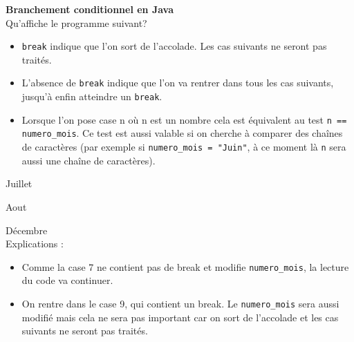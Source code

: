  \begin{Exercice}[10 minutes] \textbf{Branchement conditionnel en Java}\\
   Qu'affiche le programme suivant? 
   
   
    
     \begin{conseil}
          \begin{itemize}
             \item \lstinline{break} indique que l'on sort de l'accolade. Les cas suivants ne seront pas traités.
             \item L'absence de \lstinline{break} indique que l'on va rentrer dans tous les cas suivants, jusqu'à enfin atteindre un \lstinline{break}.
             \item Lorsque l'on pose case n où n est un nombre cela est équivalent au test \lstinline{n == numero_mois}. Ce test est aussi valable si on cherche à comparer des chaînes de caractères (par exemple si \lstinline{numero_mois = "Juin"}, à ce moment là \lstinline{n} sera aussi une chaîne de caractères).
          \end{itemize}
         
     \end{conseil}
     \begin{solution}
     
     Juillet
     
    Aout
    
    Décembre \\
    
    Explications : \\
    
    \begin{itemize}
             \item Comme la case 7 ne contient pas de break et modifie \lstinline{numero_mois}, la lecture du code va continuer.
             \item On rentre dans le case 9, qui contient un break. Le \lstinline{numero_mois} sera aussi modifié mais cela ne sera pas important car on sort de l'accolade et les cas suivants ne seront pas traités.
       \end{itemize}
            
     \end{solution}   
 \end{Exercice}


